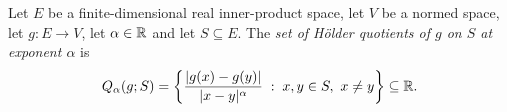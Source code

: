 \begin{definition}
Let $E$ be a finite-dimensional real inner-product space, let $V$ be a normed
space, let $g:E\to V$, let $\alpha\in\mathbb{R}$ and let $S\subseteq E$. The
\emph{set of H\"older quotients of $g$ on $S$ at exponent $\alpha$} is
\[
  Q_\alpha(g;S)
   =\left\{\frac{|g(x)-g(y)|}{|x-y|^\alpha}
        \;:\;x,y\in S,\ x\ne y\right\}\subseteq\mathbb{R} .
\]
\end{definition}
